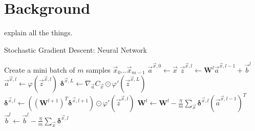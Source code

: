 \chapter{Background}\label{chap:background}
explain all the things.

\begin{algorithm}[p]
\caption{Stochastic Gradient Descent: Neural Network}
\label{alg:backpropnn}
\begin{algorithmic}
    \State Create a mini batch of $m$ samples $\vec{x}_0 \ldots \vec{x}_{m-1}$
        \State $\vec{a}^{\vec{x},0} \gets \vec{x}$  
          
            \State $\vec{z}^{\vec{x},l} \gets \mathbf{W}^l \vec{a}^{\vec{x},l-1}+\vec{b}^l$
            \State $\vec{a}^{\vec{x},l} \gets \varphi(\vec{z}^{\vec{x},l})$
        \EndFor
        \State $\bm{\delta}^{\vec{x},L} \gets \nabla_{\vec{a}} C_\vec{x} \odot \varphi'(\vec{z}^{\vec{x},L})$ 
          
            \State $\bm{\delta}^{\vec{x},l} \gets ((\mathbf{W}^{l+1})^T \bm{\delta}^{\vec{x},l+1})\odot \varphi'(\vec{z}^{\vec{x},l})$
        \EndFor
    \EndFor
     
        \State $ \mathbf{W}^l \gets \mathbf{W}^l-\frac{\eta}{m} \sum_\vec{x} \bm{\delta}^{\vec{x},l} (\vec{a}^{\vec{x},l-1})^T$
        \State $\vec{b}^l \gets \vec{b}^l-\frac{\eta}{m}\sum_\vec{x} \bm{\delta}^{\vec{x},l}$
    \EndFor
\end{algorithmic}
\end{algorithm}

